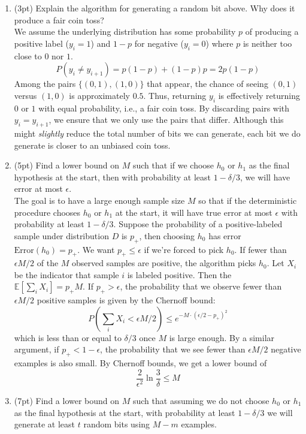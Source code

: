 \documentclass[11pt]{article}
\DeclareMathOperator{\1}{\mathbbm{1}}
\begin{document}
\begin{problem}
\begin{enumerate}
\item (3pt) Explain the algorithm for generating a random bit above. Why does it produce a fair coin toss? \\
We assume the underlying distribution has some probability $p$ of producing a positive label ($y_i = 1$) and $1-p$ for negative ($y_i = 0$) where $p$ is neither too close to $0$ nor $1$. $$P(y_i \neq y_{i+1})=p(1-p) +(1-p)p = 2p(1-p)$$ Among the pairs $\{ (0,1), (1,0) \}$ that appear, the chance of seeing $(0,1)$ versus $(1,0)$ is approximately $0.5$. Thus, returning $y_i$ is effectively returning $0$ or $1$ with equal probability, i.e., a fair coin toss. By discarding pairs with $y_i = y_{i+1}$, we ensure that we only use the pairs that differ. Although this might \textit{slightly} reduce the total number of bits we can generate, each bit we do generate is closer to an unbiased coin toss.
\item (5pt) Find a lower bound on $M$ such that if we choose $h_0$ or $h_1$ as the 
final hypothesis at the start, then with probability at least $1-\delta/3$, we
will have error at most $\epsilon$. \\
The goal is to have a large enough sample size $M$ so that if the deterministic procedure chooses $h_0$ or $h_1$ at the start, it will have true error at most $\epsilon$ with probability at least $1-\delta/3$. Suppose the probability of a positive-labeled sample under distribution $D$ is $p_+$, then choosing $h_0$ has error $\text{Error}(h_0)=p_+$. We want $p_+ \leq \epsilon$ if we're forced to pick $h_0$. If fewer than $\epsilon M/2$ of the $M$ observed samples are positive, the algorithm picks $h_0$. Let $X_i$ be the indicator that sample $i$ is labeled positive. Then the $\mathbb{E}[\sum_i X_i]=p_+ M$. If $p_+ > \epsilon$, the probability that we observe fewer than $\epsilon M/2$ positive samples is given by the Chernoff bound: $$P(\sum_i X_i < \epsilon M/2) \leq e^{-M \cdot (\epsilon/2 - p_+)^2}$$ which is less than or equal to $\delta/3$ once $M$ is large enough. By a similar argument, if $p_+ < 1-\epsilon$, the probability that we see fewer than $\epsilon M/2$ negative examples is also small. By Chernoff bounds, we get a lower bound of $$\frac{2}{\epsilon ^2} \ln \frac{3}{\delta} \leq M$$
\item (7pt) Find a lower bound on $M$ such that assuming we do not choose $h_0$ or $h_1$ as the final hypothesis at the start, with probability at least $1-\delta/3$ we will generate at least $t$ random bits using $M-m$ examples. \\

\end{enumerate}
\end{problem}
\end{document}
